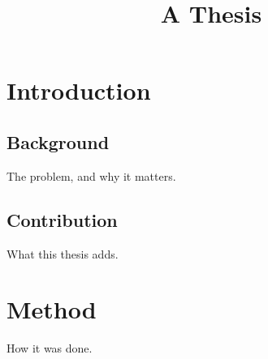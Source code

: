 \documentclass[12pt,oneside]{book}
\title{A Thesis}
\author{}
\date{}
\begin{document}
\maketitle
\tableofcontents

\chapter{Introduction}
\section{Background}
The problem, and why it matters.

\section{Contribution}
What this thesis adds.

\chapter{Method}
How it was done.
\end{document}
